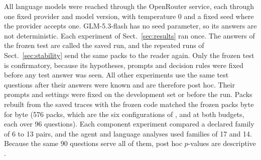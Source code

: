 All language models were reached through the OpenRouter service, each through one fixed provider and model version, with temperature 0 and a fixed seed where the provider accepts one. GLM-5.3-flash has no seed parameter, so its answers are not deterministic. Each experiment of Sect.~\ref{sec:results} ran once. The answers of the frozen test are called the saved run, and the repeated runs of Sect.~\ref{sec:stability} send the same packs to the reader again. Only the frozen test is confirmatory, because its hypotheses, prompts and decision rules were fixed before any test answer was seen. All other experiments use the same test questions after their answers were known and are therefore post hoc. Their prompts and settings were fixed on the development set or before the run. Packs rebuilt from the saved traces with the frozen code matched the frozen packs byte for byte (576 packs, which are the six configurations of \hybrid{}, \hr{} and \lexb{} at both budgets, each over 96 questions). Each component experiment compared a declared family of 6 to 13 pairs, and the agent and language analyses used families of 17 and 14. Because the same 90 questions serve all of them, post hoc $p$-values are descriptive \citep{dwork2015reusable}.
